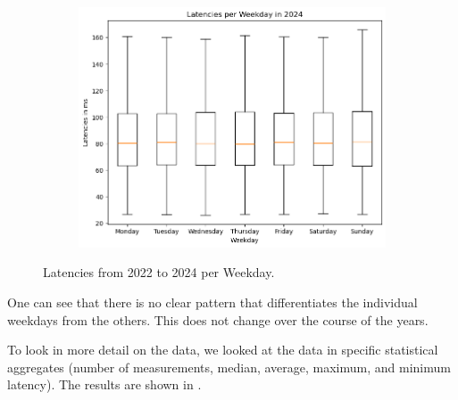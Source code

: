 \begin{figure}
\begin{subfigure}[b]{0.32\linewidth}
		\includegraphics[width=\linewidth]{chapters/4-results/latency/img/latency_2024_weekdays.png}
	\end{subfigure}
	\caption{Latencies from 2022 to 2024 per Weekday.}
	\label{fig:latencies-per-weekday}
\end{figure}

One can see that there is no clear pattern that differentiates the individual
weekdays from the others. This does not change over the course of the years.

To look in more detail on the data, we looked at the data in specific
statistical aggregates (number of measurements, median, average, maximum, and
minimum latency). The results are shown in .

